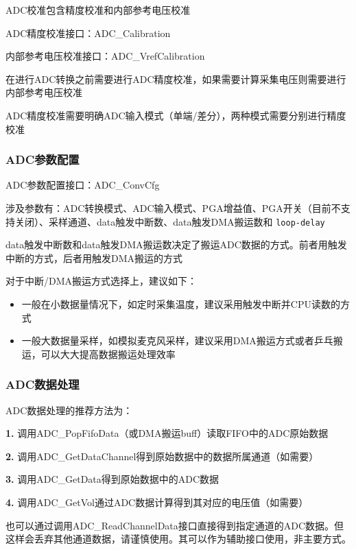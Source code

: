 \documentclass[
  12pt,
]{book}
\begin{document}
ADC校准包含精度校准和内部参考电压校准

ADC精度校准接口：ADC\_Calibration

内部参考电压校准接口：ADC\_VrefCalibration

在进行ADC转换之前需要进行ADC精度校准，如果需要计算采集电压则需要进行内部参考电压校准

ADC精度校准需要明确ADC输入模式（单端/差分），两种模式需要分别进行精度校准

\hypertarget{adcux53c2ux6570ux914dux7f6e}{%
\subsubsection{ADC参数配置}\label{adcux53c2ux6570ux914dux7f6e}}

ADC参数配置接口：ADC\_ConvCfg

涉及参数有：ADC转换模式、ADC输入模式、PGA增益值、PGA开关（目前不支持关闭）、采样通道、data触发中断数、data触发DMA搬运数和 \texttt{loop-delay}

data触发中断数和data触发DMA搬运数决定了搬运ADC数据的方式。前者用触发中断的方式，后者用触发DMA搬运的方式

对于中断/DMA搬运方式选择上，建议如下：

\begin{itemize}
\item
  一般在小数据量情况下，如定时采集温度，建议采用触发中断并CPU读数的方式
\item
  一般大数据量采样，如模拟麦克风采样，建议采用DMA搬运方式或者乒乓搬运，可以大大提高数据搬运处理效率
\end{itemize}

\hypertarget{adcux6570ux636eux5904ux7406}{%
\subsubsection{ADC数据处理}\label{adcux6570ux636eux5904ux7406}}

ADC数据处理的推荐方法为：

\textbf{1.} 调用ADC\_PopFifoData（或DMA搬运buff）读取FIFO中的ADC原始数据

\textbf{2.} 调用ADC\_GetDataChannel得到原始数据中的数据所属通道（如需要）

\textbf{3.} 调用ADC\_GetData得到原始数据中的ADC数据

\textbf{4.} 调用ADC\_GetVol通过ADC数据计算得到其对应的电压值（如需要）

也可以通过调用ADC\_ReadChannelData接口直接得到指定通道的ADC数据。但这样会丢弃其他通道数据，请谨慎使用。其可以作为辅助接口使用，非主要方式。
\end{document}
